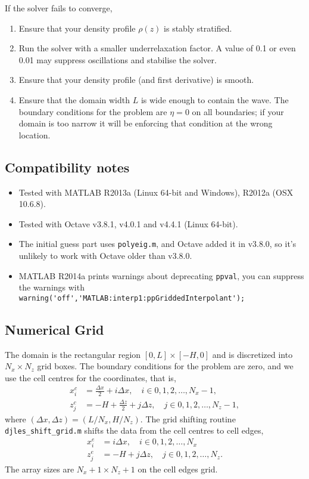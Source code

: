 \documentclass[letterpaper]{article}
\begin{document}
If the solver fails to converge, 
\begin{enumerate}
 \item Ensure that your density profile $\rho(z)$ is stably stratified.
 \item Run the solver with a smaller underrelaxation factor. A value of 0.1 or even 0.01 may suppress oscillations and stabilise the solver. 
 \item Ensure that your density profile (and first derivative) is smooth.
 \item Ensure that the domain width $L$ is wide enough to contain the wave. The boundary conditions for the problem are $\eta=0$ on all boundaries; if your domain is too narrow it will be enforcing that condition at the wrong location.
\end{enumerate}

\subsection{Compatibility notes}
\begin{itemize}
 \item Tested with MATLAB R2013a (Linux 64-bit and Windows), R2012a (OSX 10.6.8).
 \item Tested with Octave v3.8.1, v4.0.1 and v4.4.1 (Linux 64-bit).
 \item The initial guess part uses \verb+polyeig.m+, and Octave added it in v3.8.0, so it's unlikely to work with Octave older than v3.8.0.
 \item MATLAB R2014a prints warnings about deprecating \verb+ppval+, you can suppress the warnings with \\ \verb+warning('off','MATLAB:interp1:ppGriddedInterpolant');+
\end{itemize}

\subsection{Numerical Grid}
The domain is the rectangular region $[0,L] \times [-H,0]$ and is discretized into $N_x\times N_z$ grid boxes. The boundary conditions for the problem are zero, and we use the cell centres for the coordinates, that is,
\begin{align}
x_i^c &= \frac{\Delta x}{2} + i \Delta x, \quad i \in 0,1,2,\ldots,N_x-1,\\
z_j^c &= -H + \frac{\Delta z}{2} + j \Delta z, \quad j \in 0,1,2,\ldots,N_z-1,
\end{align}
where $(\Delta x, \Delta z) = (L/N_x, H/N_z)$. The grid shifting routine \verb+djles_shift_grid.m+ shifts the data from the cell centres to cell edges, 
\begin{align}
x_i^e &= i \Delta x, \quad i \in 0,1,2,\ldots,N_x\\
z_j^e &= -H + j \Delta z, \quad j  \in 0,1,2,\ldots,N_z.
\end{align}
The array sizes are $N_x+1 \times N_z+1$ on the cell edges grid.
\end{document}
